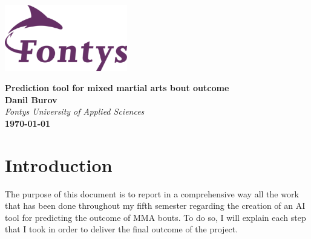 \documentclass{article}
\begin{document}
	
	\begin{titlepage}
		\centering
		\vspace*{3cm}
		
		\includegraphics[width=0.4\textwidth]{images/fontyslogo.png}
		\vspace{1.5cm}
		
		{\Huge\bfseries Prediction tool for mixed martial arts bout outcome}\\[1cm]
		
		\textbf{Danil Burov}\\
		\vspace{0.5cm}
		\textit{Fontys University of Applied Sciences}\\[3cm]
		\vfill
		\textbf{\today}
		
	\end{titlepage}
	\newpage
	\tableofcontents
	\newpage
\section{Introduction}
	The purpose of this document is to report in a comprehensive way all the work that has been done throughout my fifth semester regarding the creation of an AI tool for predicting the outcome of MMA bouts. To do so, I will explain each step that I took in order to deliver the final outcome of the project.
\end{document}
